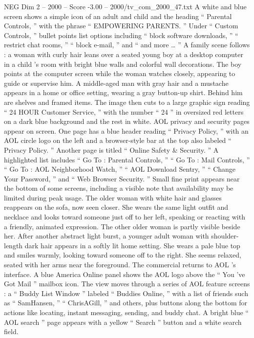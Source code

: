\begin{textsample}{NEG Dim 2 – 2000 – Score -3.00 – 2000/tv\_com\_2000\_47.txt}
A white and blue screen shows a simple icon of an adult and child and the heading “ Parental Controls, ” with the phrase “ EMPOWERING PARENTS. ” Under “ Custom Controls, ” bullet points list options including “ block software downloads, ” “ restrict chat rooms, ” “ block e-mail, ” and “ and more … ” A family scene follows : a woman with curly hair leans over a seated young boy at a desktop computer in a child ’s room with bright blue walls and colorful wall decorations.
The boy points at the computer screen while the woman watches closely, appearing to guide or supervise him.
A middle-aged man with gray hair and a mustache appears in a home or office setting, wearing a gray button-up shirt.
Behind him are shelves and framed items.
The image then cuts to a large graphic sign reading “ 24 HOUR Customer Service, ” with the number “ 24 ” in oversized red letters on a dark blue background and the rest in white.
AOL privacy and security pages appear on screen.
One page has a blue header reading “ Privacy Policy, ” with an AOL circle logo on the left and a browser-style bar at the top also labeled “ Privacy Policy. ” Another page is titled “ Online Safety \& Security. ” A highlighted list includes “ Go To : Parental Controls, ” “ Go To : Mail Controls, ” “ Go To : AOL Neighborhood Watch, ” “ AOL Download Sentry, ” “ Change Your Password, ” and “ Web Browser Security. ” Small fine print appears near the bottom of some screens, including a visible note that availability may be limited during peak usage.
The older woman with white hair and glasses reappears on the sofa, now seen closer.
She wears the same light outfit and necklace and looks toward someone just off to her left, speaking or reacting with a friendly, animated expression.
The other older woman is partly visible beside her.
After another abstract light burst, a younger adult woman with shoulder-length dark hair appears in a softly lit home setting.
She wears a pale blue top and smiles warmly, looking toward someone off to the right.
She seems relaxed, seated with her arms near the foreground.
The commercial returns to AOL ’s interface.
A blue America Online panel shows the AOL logo above the “ You ’ve Got Mail ” mailbox icon.
The view moves through a series of AOL feature screens : a “ Buddy List Window ” labeled “ Buddies Online, ” with a list of friends such as “ SamHansen, ” “ ChrisAGill, ” and others, plus buttons along the bottom for actions like locating, instant messaging, sending, and buddy chat.
A bright blue “ AOL search ” page appears with a yellow “ Search ” button and a white search field.

\end{textsample}
